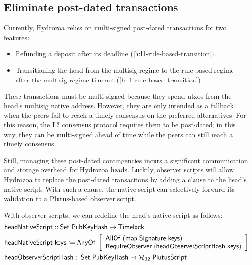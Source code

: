 \documentclass[../hydrozoa.tex]{subfiles}
\begin{document}
\subsection{Eliminate post-dated transactions}%
\label{h:observer-script-eliminate-post-dated-txs}%

Currently, Hydrozoa relies on multi-signed post-dated transactions for two features:
\begin{itemize}
  \item Refunding a deposit after its deadline (\cref{h:l1-rule-based-transition}).
  \item Transitioning the head from the multisig regime to the rule-based regime after the multisig regime timeout (\cref{h:l1-rule-based-transition}).
\end{itemize}
These transactions must be multi-signed because they spend utxos from the head's multisig native address.
However, they are only intended as a fallback when the peers fail to reach a timely consensus on the preferred alternatives. For this reason, the L2 consensus protocol requires them to be post-dated; in this way, they can be multi-signed ahead of time while the peers can still reach a timely consensus.

Still, managing these post-dated contingencies incurs a significant communication and storage overhead for Hydrozoa heads.
Luckily, observer scripts will allow Hydrozoa to replace the post-dated transactions by adding a  clause to the head's native script.
With such a clause, the native script can selectively forward its validation to a Plutus-based observer script.

With observer scripts, we can redefine the head's native script as follows:
\begin{equation*}
\begin{split}
  &\mathsf{headNativeScript} :: \mathsf{Set} \; \mathsf{PubKeyHash} -> \mathsf{Timelock} \\
  &\mathsf{headNativeScript} \; \mathsf{keys} \coloneq
    \mathsf{AnyOf} \; \left[
    \begin{array}{l}
      \mathsf{AllOf} \; (\mathsf{map} \; \mathsf{Signature} \; \mathsf{keys}) \\
      \mathsf{RequireObserver} \; (\mathsf{headObserverScriptHash \; \mathsf{keys}})
    \end{array}\right] \\
  &\mathsf{headObserverScriptHash} ::
      \mathsf{Set} \; \mathsf{PubKeyHash} -> \mathcal{H}_{32} \; \mathsf{PlutusScript}
\end{split}
\end{equation*}
\end{document}
